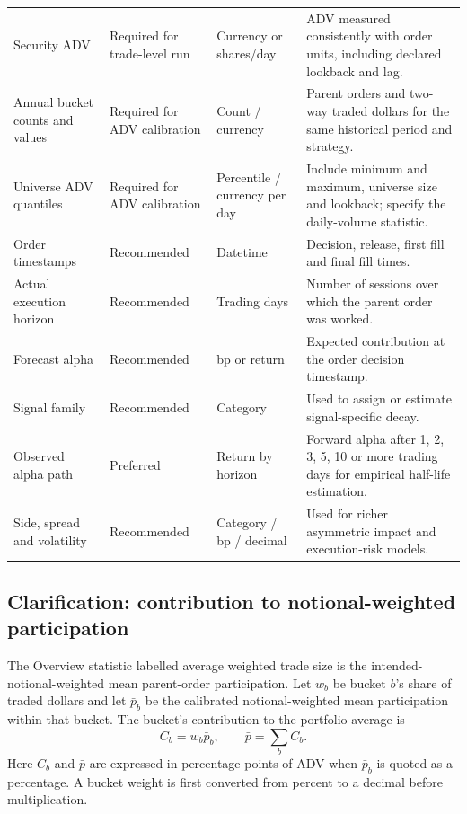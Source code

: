 \documentclass[11pt,a4paper]{article}
\numberwithin{equation}{section}
\begin{document}
\begin{longtable}{@{}p{}p{}p{}p{}@{}}
Security ADV & Required for trade-level run & Currency or shares/day & ADV measured consistently with order units, including declared lookback and lag.\\
Annual bucket counts and values & Required for ADV calibration & Count / currency & Parent orders and two-way traded dollars for the same historical period and strategy.\\
Universe ADV quantiles & Required for ADV calibration & Percentile / currency per day & Include minimum and maximum, universe size and lookback; specify the daily-volume statistic.\\
Order timestamps & Recommended & Datetime & Decision, release, first fill and final fill times.\\
Actual execution horizon & Recommended & Trading days & Number of sessions over which the parent order was worked.\\
Forecast alpha & Recommended & bp or return & Expected contribution at the order decision timestamp.\\
Signal family & Recommended & Category & Used to assign or estimate signal-specific decay.\\
Observed alpha path & Preferred & Return by horizon & Forward alpha after 1, 2, 3, 5, 10 or more trading days for empirical half-life estimation.\\
Side, spread and volatility & Recommended & Category / bp / decimal & Used for richer asymmetric impact and execution-risk models.\\
\bottomrule
\end{longtable}

\normalsize
\subsection{Clarification: contribution to notional-weighted participation}
The Overview statistic labelled average weighted trade size is the intended-notional-weighted
mean parent-order participation. Let $w_b$ be bucket $b$'s share of traded dollars and let
$\bar p_b$ be the calibrated notional-weighted mean participation within that bucket. The bucket's
contribution to the portfolio average is
\begin{equation}\label{eq:bucketcontribution}
 C_b=w_b\bar p_b,\qquad \bar p=\sum_b C_b.
\end{equation}
Here $C_b$ and $\bar p$ are expressed in percentage points of ADV when $\bar p_b$ is quoted as a
percentage. A bucket weight is first converted from percent to a decimal before multiplication.
\end{document}
